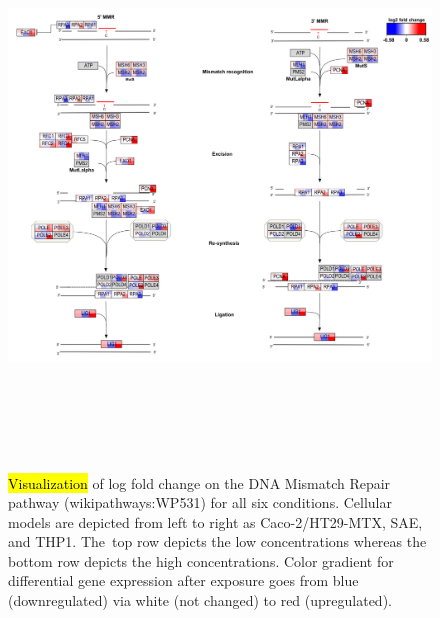 \documentclass[ijms,article,accept,moreauthors,pdftex]{Definitions/mdpi}
\begin{document}
\begin{paracol}{2}
\switchcolumn

\vspace{-12pt}

\clearpage
\end{paracol}
\nointerlineskip
\begin{figure}[H]
\widefigure
\includegraphics[height=15cm]{figA3.png}
\caption{\hl{Visualization} of log fold change on the DNA Mismatch Repair pathway (wikipathways:WP531) for all six conditions.
{Cellular models} are depicted from left to right as {Caco-2/HT29-MTX}, SAE, and THP1. The~top row depicts the low concentrations whereas the bottom row depicts the high concentrations. {Color gradient for differential gene expression after exposure goes from blue (downregulated) via white (not changed) to red (upregulated).}
}
\label{fig:figA3}
\end{figure}
\end{document}
